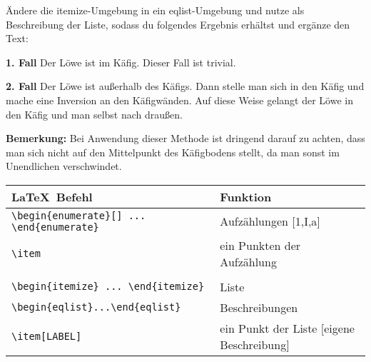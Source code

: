 \begin{frame}[fragile]
	\vspace{-0.3cm}
	\begin{Aufgabe}
		Ändere die itemize-Umgebung in ein eqlist-Umgebung und nutze  als Beschreibung der Liste, sodass du folgendes Ergebnis erhältst und ergänze den Text:
	\end{Aufgabe}
	\begin{outputbox}
		\vspace{-0.2cm}
		\begin{eqlist}
			\item[\textbf{1. Fall}]
				Der Löwe ist im Käfig. Dieser Fall ist trivial.
			\item[\textbf{2. Fall}]
				Der Löwe ist außerhalb des Käfigs. Dann stelle man sich in den Käfig und mache eine Inversion an den Käfigwänden. Auf diese Weise gelangt der Löwe in den Käfig und man selbst nach draußen.
		\end{eqlist}
		\vspace{-0.2cm}
		\textbf{Bemerkung:}
		Bei Anwendung dieser Methode ist dringend darauf zu achten, dass man sich nicht auf den Mittelpunkt des Käfigbodens stellt, da man sonst im Unendlichen verschwindet.
	\end{outputbox}
	\begin{center}
	\begin{tabular}{ll}
		\toprule
		\LaTeX\ Befehl										&	Funktion									\\ \midrule
		\lstinline|\begin{enumerate}[] ... \end{enumerate}|			&	Aufzählungen [1,I,a]								\\
		\lstinline|\item|							&	ein Punkten der Aufzählung	\\ \\
		\lstinline|\begin{itemize} ... \end{itemize}|		&	Liste				\\ 
		\lstinline|\begin{eqlist}...\end{eqlist}|	&	 Beschreibungen				\\
		\lstinline|\item[LABEL]|							&	ein Punkt der Liste [eigene Beschreibung]	\\
		\bottomrule
	\end{tabular}
\end{center}
	\vspace{0.1cm}
\end{frame}



